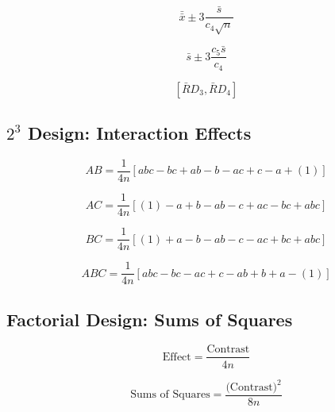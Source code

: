 \documentclass[a4paper,12pt]{article}
\begin{document}
\begin{multicols}{2}
	
\[ \bar{\bar{x}} \pm 3\frac{\bar{s}}{c_4\sqrt{n}}\]

\[ \bar{s} \pm 3\frac{c_5\bar{s}}{c_4}\]

\[\left[ \bar{R}D_3, \bar{R}D_4\right]\]
\end{multicols}
\subsection*{$2^3$ Design: Interaction Effects}

\[ AB = \frac{1}{4n} \left[ abc - bc + ab - b - ac + c - a + (1) \right] \]

\[ AC = \frac{1}{4n} \left[ (1) - a + b - ab -c + ac - bc + abc \right] \]

\[ BC = \frac{1}{4n} \left[ (1) + a - b - ab - c - ac + bc + abc \right] \]

\[ABC = \frac{1}{4n} \left[ abc - bc - ac + c - ab + b +  a - (1) \right] \]

\bigskip


\subsection*{Factorial Design: Sums of Squares}

\[\mbox{Effect} =  \frac{\mbox{Contrast}}{4n}\]

\[\mbox{Sums of Squares} =  \frac{\mbox{(Contrast)}^2}{8n}\]
\end{document}
